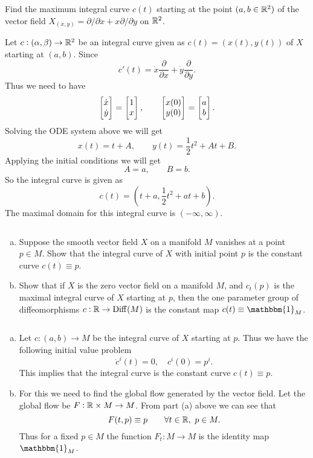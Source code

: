 \begin{problem}
	Find the maximum integral curve $ c(t) $ starting at the point $ (a,b \in \mathbb{R}^2) $ of the vector field $ X_{(x,y)} = \partial/\partial x + x \partial/\partial y $ on $ \mathbb{R}^2 $.
\end{problem}
\begin{solution}
	Let $ c:(\alpha,\beta) \to \mathbb{R}^2 $ be an integral curve given as $ c(t) = (x(t),y(t)) $ of $ X $ starting at $ (a,b) $. Since
	\[ c'(t) = \dot{x}\frac{\partial }{\partial x} + \dot{y} \frac{\partial }{\partial y}. \]
	Thus we need to have
	\[ \begin{bmatrix} \dot{x} \\ \dot{y} \end{bmatrix} = \begin{bmatrix} 1 \\ x \end{bmatrix},\qquad \begin{bmatrix} x(0) \\ y(0) \end{bmatrix} = \begin{bmatrix} a \\ b \end{bmatrix}. \]
	Solving the ODE system above we will get
	\[ x(t) = t + A, \qquad y(t) = \frac12 t^2 + A t + B. \]
	Applying the initial conditions we will get
	\[ A = a,\qquad B = b. \]
	So the integral curve is given as
	\[ c(t) = (t+a, \frac12 t^2 + at + b). \]
	The maximal domain for this integral curve is $ (-\infty,\infty) $.
\end{solution}

\begin{problem}
	$ \ $
	\begin{enumerate}[(a)]
		\item Suppose the smooth vector field $ X $ on a manifold $ M $ vanishes at a point $ p \in M $. Show that the integral curve of $ X $ with initial point $ p $ is the constant curve $ c(t) \equiv p $.
		\item Show that if $ X $ is the zero vector field on a manifold $ M $, and $ c_t(p) $ is the maximal integral curve of $ X $ starting at $ p $, then the one parameter group of diffeomorphisms $ c: \mathbb{R} \to \operatorname{Diff}(M) $ is the constant map $ c(t) \equiv \mathbbm{1}_M $.
	\end{enumerate}
\end{problem}
\begin{solution}
	$ \ $
	\begin{enumerate}[(a)]
		\item 	Let $ c: (a,b) \to M $ be the integral curve of $ X $ starting at $ p $. Thus we have the following initial value problem
		\[ \dot{c}^i(t) = 0, \quad c^i(0) = p^i. \]
		This implies that the integral curve is the constant curve $ c(t) \equiv p $.
		\item For this we need to find the global flow generated by the vector field. Let the global flow be $ F: \mathbb{R} \times M \to M $. From part (a) above we can see that 
		\[ F(t,p) \equiv p \qquad \forall t \in \mathbb{R},\ p \in M. \]
		Thus for a fixed $ p \in M $ the function $ F_t: M \to M $ is the identity map $ \mathbbm{1}_M $.
	\end{enumerate}
\end{solution}

